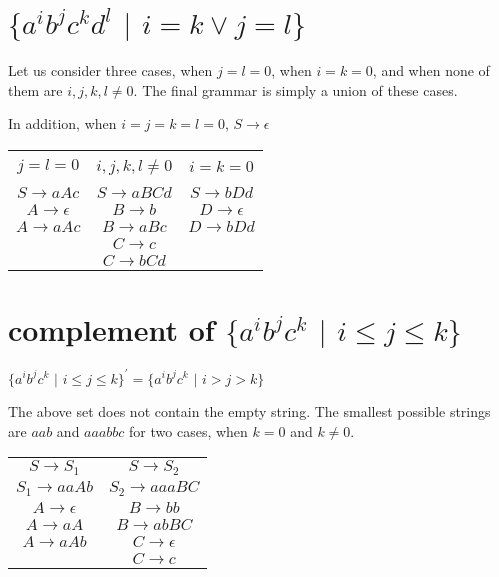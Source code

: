 \documentclass[11pt,letterpaper]{article}
\begin{document}
\section{$\{a^i b^j c^k d^l$ $|$ $i=k \vee j=l\}$}
Let us consider three cases, when $j=l=0$, when $i=k=0$, and when none of them are $i,j,k,l \neq 0$. The final grammar is simply a union of these cases.
\begin{table}[!h]
\label{tab:04a}
\centering
In addition, when $i=j=k=l=0$, $S \rightarrow \epsilon$ \\
\begin{tabular}{c c c}
&&\\
$j=l=0$ &
$i,j,k,l \neq 0$ &
$i=k=0$ \\
&&\\
$S \rightarrow aAc$ &
$S \rightarrow aBCd$ &
$S \rightarrow bDd$ \\

$A \rightarrow \epsilon$ &
$B \rightarrow b$ &
$D \rightarrow \epsilon$ \\

$A \rightarrow aAc$ &
$B \rightarrow aBc$ &
$D \rightarrow bDd$ \\

& $C \rightarrow c$ &\\
& $C \rightarrow bCd$ &\\

\end{tabular} 
\end{table}

\section{complement of $\{a^i b^j c^k$ $|$ $i \leq j \leq k\}$}
\begin{center}
$\{a^i b^j c^k$ $|$ $i \leq j \leq k\}^{'} = \{a^i b^j c^k$ $|$ $i > j > k\}$ \\
\end{center}
The above set does not contain the empty string. The smallest possible strings are $aab$ and $aaabbc$ for two cases, when $k=0$ and $k \neq 0$.
\begin{table}[!h]
    \centering
    \begin{tabular}{c c}
    $S \rightarrow S_1$ & 
    $S \rightarrow S_2$ \\
    
    $S_1 \rightarrow aaAb$ &
    $S_2 \rightarrow aaaBC$ \\
    
    $A \rightarrow \epsilon$ &
    $B \rightarrow bb$ \\
    
    $A \rightarrow aA$ &
    $B \rightarrow abBC$ \\
    
    $A \rightarrow aAb$ &
    $C \rightarrow \epsilon$ \\
    
    &
    $C \rightarrow c$
    \end{tabular}
    \label{tab:5}
\end{table}
\end{document}
